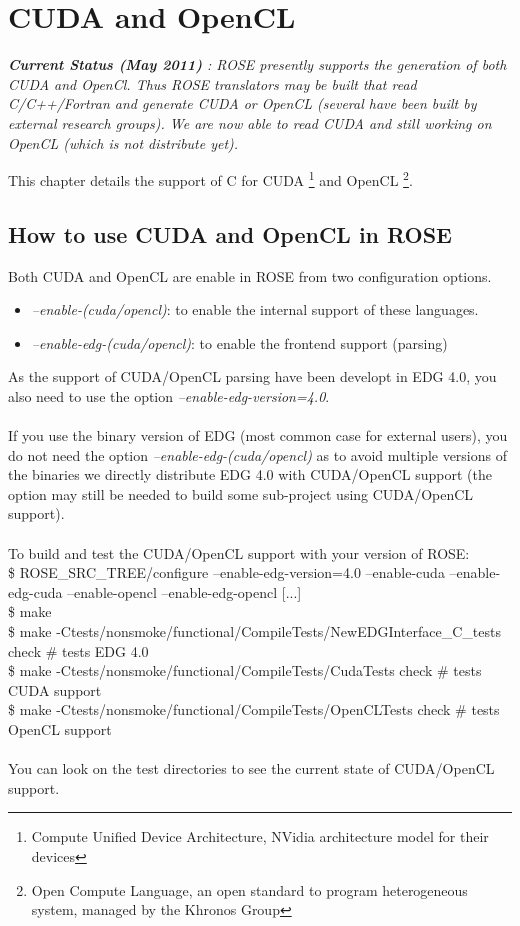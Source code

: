 \chapter{CUDA and OpenCL}

\label{heterogeneous:heterogeneous}

{\em {\bf Current Status (May 2011) }: ROSE presently supports the generation of both CUDA and OpenCl.
    Thus ROSE translators may be built that read C/C++/Fortran and generate
    CUDA or OpenCL (several have been built by external research groups).
    We are now able to read CUDA and still working on OpenCL (which is not distribute yet).}
\vspace{0.25in}

This chapter details the support of C for CUDA \footnote{Compute Unified Device Architecture, NVidia architecture model for their devices} and OpenCL \footnote{Open Compute Language,
an open standard to program heterogeneous system, managed by the Khronos Group}.

	\section{How to use CUDA and OpenCL in ROSE}
	
	Both CUDA and OpenCL are enable in ROSE from two configuration options.
\begin{itemize}
	\item \emph{--enable-(cuda/opencl)}: to enable the internal support of these languages.
	\item \emph{--enable-edg-(cuda/opencl)}: to enable the frontend support (parsing)
\end{itemize}
	As the support of CUDA/OpenCL parsing have been developt in EDG 4.0, you also need to use the option \emph{--enable-edg-version=4.0}.\\
	\\
	If you use the binary version of EDG (most common case for external users), you do not need the option \emph{--enable-edg-(cuda/opencl)} as to avoid 
	multiple versions of the binaries we directly distribute EDG 4.0 with CUDA/OpenCL support (the option may still be needed to build some sub-project using CUDA/OpenCL support).\\
	\\
	To build and test the CUDA/OpenCL support with your version of ROSE: \\
	\$ ROSE\_SRC\_TREE/configure --enable-edg-version=4.0 --enable-cuda --enable-edg-cuda --enable-opencl --enable-edg-opencl [...] \\
	\$ make \\
	\$ make -Ctests/nonsmoke/functional/CompileTests/NewEDGInterface\_C\_tests check \# tests EDG 4.0 \\
	\$ make -Ctests/nonsmoke/functional/CompileTests/CudaTests check \# tests CUDA support \\
	\$ make -Ctests/nonsmoke/functional/CompileTests/OpenCLTests check \# tests OpenCL support \\
	\\
	You can look on the test directories to see the current state of CUDA/OpenCL support.
	
